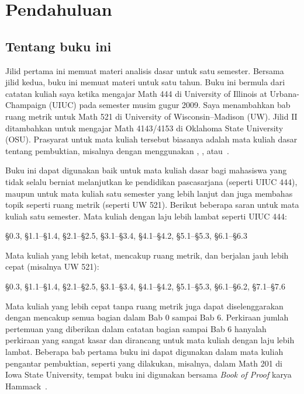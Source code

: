 \chapter*{Pendahuluan}


\section{Tentang buku ini}

\VolOneIntroExtrahead

Jilid pertama ini memuat materi analisis dasar untuk satu semester.
Bersama jilid kedua, buku ini memuat materi untuk satu tahun.
Buku ini bermula dari catatan kuliah saya ketika mengajar Math 444 di
University of Illinois at Urbana-Champaign (UIUC) pada semester musim gugur
2009. Saya menambahkan bab ruang metrik untuk Math 521 di University of
Wisconsin--Madison (UW)\@.
Jilid II ditambahkan untuk mengajar Math 4143/4153 di Oklahoma State University
(OSU)\@.
Prasyarat untuk mata kuliah tersebut biasanya adalah mata kuliah dasar tentang
pembuktian, misalnya dengan menggunakan \cite{Hammack}, \cite{GIAM},
atau~\cite{DW}.

Buku ini dapat digunakan baik untuk mata kuliah dasar bagi mahasiswa yang tidak
selalu berniat melanjutkan ke pendidikan pascasarjana (seperti UIUC 444),
maupun untuk mata kuliah satu semester yang lebih lanjut dan juga membahas
topik seperti ruang metrik (seperti UW 521).
Berikut beberapa saran untuk mata kuliah satu semester.
Mata kuliah dengan laju lebih lambat seperti UIUC 444:
\begin{center}
\S0.3, \S1.1--\S1.4, \S2.1--\S2.5, \S3.1--\S3.4, \S4.1--\S4.2,
\S5.1--\S5.3, \S6.1--\S6.3
\end{center}
Mata kuliah yang lebih ketat, mencakup ruang metrik, dan berjalan jauh lebih
cepat (misalnya UW 521):
\begin{center}
\S0.3, \S1.1--\S1.4, \S2.1--\S2.5, \S3.1--\S3.4, \S4.1--\S4.2,
\S5.1--\S5.3, \S6.1--\S6.2, \S7.1--\S7.6
\end{center}
Mata kuliah yang lebih cepat tanpa ruang metrik juga dapat diselenggarakan
dengan mencakup semua bagian dalam Bab 0 sampai Bab 6. Perkiraan jumlah
pertemuan yang diberikan dalam catatan bagian sampai Bab 6 hanyalah perkiraan
yang sangat kasar dan dirancang untuk mata kuliah dengan laju lebih lambat.
Beberapa bab pertama buku ini dapat digunakan dalam mata kuliah pengantar
pembuktian, seperti yang dilakukan, misalnya, dalam Math 201 di Iowa State
University, tempat buku ini digunakan bersama \emph{Book of Proof} karya
Hammack~\cite{Hammack}.

